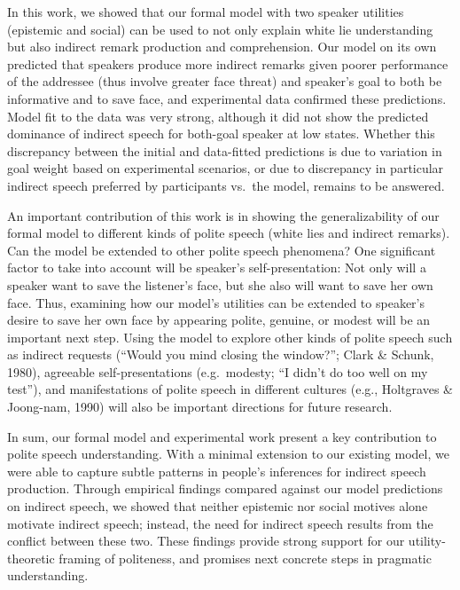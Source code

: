 \documentclass[10pt, letterpaper]{article}
\begin{document}
In this work, we showed that our formal model with two speaker utilities
(epistemic and social) can be used to not only explain white lie
understanding but also indirect remark production and comprehension. Our
model on its own predicted that speakers produce more indirect remarks
given poorer performance of the addressee (thus involve greater face
threat) and speaker's goal to both be informative and to save face, and
experimental data confirmed these predictions. Model fit to the data was
very strong, although it did not show the predicted dominance of
indirect speech for both-goal speaker at low states. Whether this
discrepancy between the initial and data-fitted predictions is due to
variation in goal weight based on experimental scenarios, or due to
discrepancy in particular indirect speech preferred by participants
vs.~the model, remains to be answered.

An important contribution of this work is in showing the
generalizability of our formal model to different kinds of polite speech
(white lies and indirect remarks). Can the model be extended to other
polite speech phenomena? One significant factor to take into account
will be speaker's self-presentation: Not only will a speaker want to
save the listener's face, but she also will want to save her own face.
Thus, examining how our model's utilities can be extended to speaker's
desire to save her own face by appearing polite, genuine, or modest will
be an important next step. Using the model to explore other kinds of
polite speech such as indirect requests (``Would you mind closing the
window?''; Clark \& Schunk, 1980), agreeable self-presentations
(e.g.~modesty; ``I didn't do too well on my test''), and manifestations
of polite speech in different cultures (e.g., Holtgraves \& Joong-nam,
1990) will also be important directions for future research.

In sum, our formal model and experimental work present a key
contribution to polite speech understanding. With a minimal extension to
our existing model, we were able to capture subtle patterns in people's
inferences for indirect speech production. Through empirical findings
compared against our model predictions on indirect speech, we showed
that neither epistemic nor social motives alone motivate indirect
speech; instead, the need for indirect speech results from the conflict
between these two. These findings provide strong support for our
utility-theoretic framing of politeness, and promises next concrete
steps in pragmatic understanding.
\end{document}
